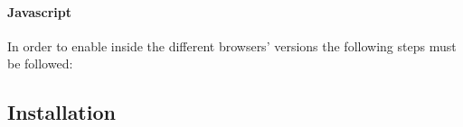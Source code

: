 \paragraph{Javascript}
In order to enable  inside the different browsers' versions the following steps must be followed:


\subsection{Installation}
\subsubsection{\progettoShort}


\subsubsection{\app}
